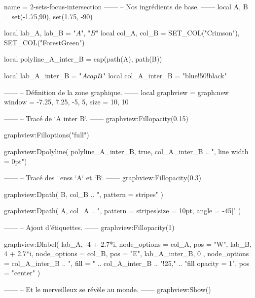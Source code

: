 \documentclass{standalone}
\begin{document}
\begin{luadraw}{name = 2-sets-focus-intersection}
------
-- Nos ingrédients de base.
------
local A, B = set(-1.75,90), set(1.75, -90)

local lab_A, lab_B = "$A$", "$B$"
local col_A, col_B = SET_COL("Crimson"), SET_COL("ForestGreen")

local polyline_A_inter_B = cap(path(A), path(B))

local lab_A_inter_B       = "$A \\cap B$"
local col_A_inter_B       = "blue!50!black"

------
-- Définition de la zone graphique.
------
local graphview = graph:new{
  window = {-7.25, 7.25, -5, 5},
  size   = {10, 10}
}

------
-- Tracé de `A inter B`.
------
graphview:Fillopacity(0.15)

graphview:Filloptions("full")

graphview:Dpolyline(
  polyline_A_inter_B,
  true,
  col_A_inter_B .. ", line width = 0pt")

------
-- Tracé des ¨enss `A` et `B`.
------
graphview:Fillopacity(0.3)

graphview:Dpath(
  B,
  col_B .. ", pattern = stripes"
)

graphview:Dpath(
  A,
  col_A .. ", pattern = {stripes[size = 10pt, angle = -45]}"
)


------
-- Ajout d'étiquettes.
------
graphview:Fillopacity(1)

graphview:Dlabel(
  lab_A, -4 + 2.7*i, {node_options = col_A, pos = "W"},
  lab_B, 4 + 2.7*i, {node_options = col_B, pos = "E"},
  lab_A_inter_B, 0 , {
    node_options = col_A_inter_B
                .. ", fill = " .. col_A_inter_B .. "!25,"
                .. "fill opacity = 1",
    pos = "center"
  })

------
-- Et le merveilleux se révèle au monde.
------
graphview:Show()
\end{luadraw}
\end{document}
